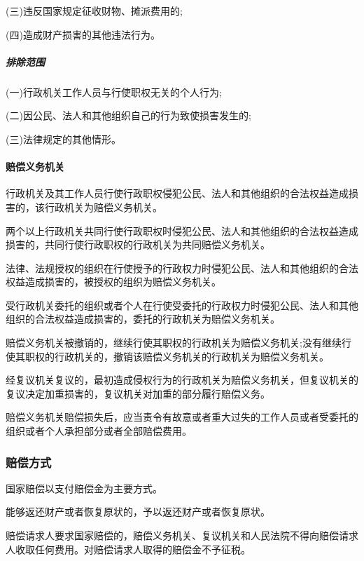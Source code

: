 (三)违反国家规定征收财物、摊派费用的;

(四)造成财产损害的其他违法行为。

\subparagraph{排除范围}

(一)行政机关工作人员与行使职权无关的个人行为;

(二)因公民、法人和其他组织自己的行为致使损害发生的;

(三)法律规定的其他情形。

\paragraph{赔偿义务机关}

行政机关及其工作人员行使行政职权侵犯公民、法人和其他组织的合法权益造成损害的，该行政机关为赔偿义务机关。

两个以上行政机关共同行使行政职权时侵犯公民、法人和其他组织的合法权益造成损害的，共同行使行政职权的行政机关为共同赔偿义务机关。

法律、法规授权的组织在行使授予的行政权力时侵犯公民、法人和其他组织的合法权益造成损害的，被授权的组织为赔偿义务机关。

受行政机关委托的组织或者个人在行使受委托的行政权力时侵犯公民、法人和其他组织的合法权益造成损害的，委托的行政机关为赔偿义务机关。

赔偿义务机关被撤销的，继续行使其职权的行政机关为赔偿义务机关;没有继续行使其职权的行政机关的，撤销该赔偿义务机关的行政机关为赔偿义务机关。

经复议机关复议的，最初造成侵权行为的行政机关为赔偿义务机关，但复议机关的复议决定加重损害的，复议机关对加重的部分履行赔偿义务。

赔偿义务机关赔偿损失后，应当责令有故意或者重大过失的工作人员或者受委托的组织或者个人承担部分或者全部赔偿费用。

\subsubsection{赔偿方式}

国家赔偿以支付赔偿金为主要方式。

能够返还财产或者恢复原状的，予以返还财产或者恢复原状。

赔偿请求人要求国家赔偿的，赔偿义务机关、复议机关和人民法院不得向赔偿请求人收取任何费用。对赔偿请求人取得的赔偿金不予征税。



